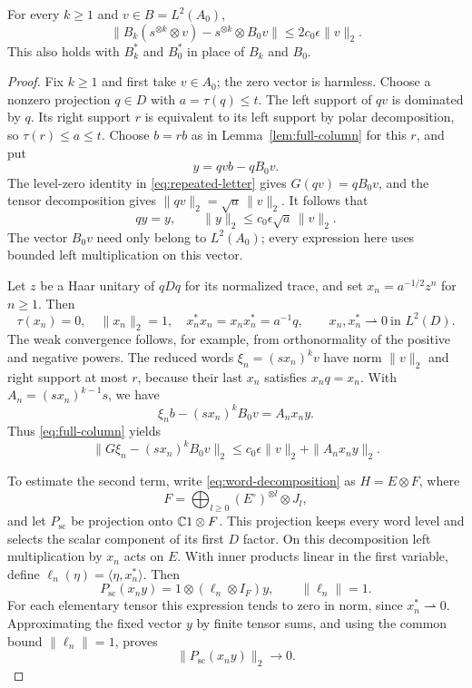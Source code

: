 \begin{lemma}
\label{lem:propagation}
For every $k\ge1$ and $v\in B=L^2(A_0)$,
\begin{equation}
  \big\|B_k(s^{\otimes k}\otimes v)
       -s^{\otimes k}\otimes B_0v\big\|
       \le 2c_0\epsilon\|v\|_2.
  \label{eq:propagation}
\end{equation}
This also holds with $B_k^*$ and $B_0^*$ in place of $B_k$ and $B_0$.
\end{lemma}

\begin{proof}
Fix $k\ge1$ and first take $v\in A_0$; the zero vector is harmless.
Choose a nonzero projection $q\in D$ with $a=\tau(q)\le t$. The left
support of $qv$ is dominated by $q$. Its right support $r$ is equivalent
to its left support by polar decomposition, so $\tau(r)\le a\le t$.
Choose $b=rb$ as in Lemma~\ref{lem:full-column} for this $r$, and put
\[
  y=qvb-qB_0v.
\]
The level-zero identity in \eqref{eq:repeated-letter} gives
$G(qv)=qB_0v$, and the tensor decomposition gives
$\|qv\|_2=\sqrt a\,\|v\|_2$. It follows that
\begin{equation}
  qy=y,\qquad \|y\|_2\le c_0\epsilon\sqrt a\,\|v\|_2.
  \label{eq:propagation-error-vector}
\end{equation}
The vector $B_0v$ need only belong to $L^2(A_0)$; every expression here
uses bounded left multiplication on this vector.

Let $z$ be a Haar unitary of $qDq$ for its normalized trace, and set
$x_n=a^{-1/2}z^n$ for $n\ge1$. Then
\[
  \tau(x_n)=0,\quad \|x_n\|_2=1,\quad
  x_n^*x_n=x_nx_n^*=a^{-1}q,
  \qquad x_n,x_n^*\rightharpoonup0\ \text{in }L^2(D).
\]
The weak convergence follows, for example, from orthonormality of the
positive and negative powers. The reduced words
$\xi_n=(sx_n)^kv$ have norm $\|v\|_2$ and right support at most $r$,
because their last $x_n$ satisfies $x_nq=x_n$. With
$A_n=(sx_n)^{k-1}s$, we have
\[
  \xi_nb-(sx_n)^kB_0v=A_nx_ny.
\]
Thus \eqref{eq:full-column} yields
\begin{equation}
  \|G\xi_n-(sx_n)^kB_0v\|_2
    \le c_0\epsilon\|v\|_2+\|A_nx_ny\|_2.
  \label{eq:propagation-prefix}
\end{equation}

To estimate the second term, write \eqref{eq:word-decomposition} as
$H=E\otimes F$, where
\[
  F=\bigoplus_{l\ge0}(E^\circ)^{\otimes l}\otimes J_l,
\]
and let $P_{\mathrm{sc}}$ be projection onto $\mathbb C1\otimes F$. This projection keeps every word level
and selects the scalar component of its first $D$ factor. On this decomposition
left multiplication by $x_n$ acts on $E$. With inner products linear in
the first variable, define $\ell_n(\eta)=\langle\eta,x_n^*\rangle$.
Then
\[
  P_{\mathrm{sc}}(x_ny)=1\otimes (\ell_n\otimes I_F)y,
  \qquad \|\ell_n\|=1.
\]
For each elementary tensor this expression tends to zero in norm, since
$x_n^*\rightharpoonup0$. Approximating the fixed vector $y$ by finite
tensor sums, and using the common bound $\|\ell_n\|=1$, proves
\begin{equation}
  \|P_{\mathrm{sc}}(x_ny)\|_2\longrightarrow0.
  \label{eq:vanishing-tensor-coefficient}
\end{equation}


\end{proof}
